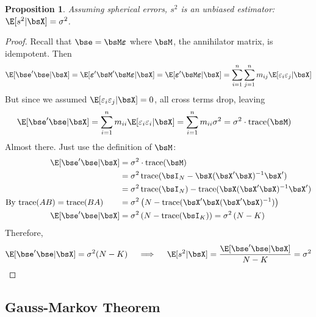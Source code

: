 \documentclass[12pt]{article}
\theoremstyle{plain}
\newtheorem{prop}[thm]{Proposition}
\theoremstyle{definition}
\theoremstyle{remark}
\newcommand{\bsvarepsilon}{\boldsymbol{\varepsilon}}
\newcommand{\trace}{\operatorname{trace}}
\newcommand{\sumin}{\sum^n_{i=1}}
\newcommand{\sumjn}{\sum^n_{j=1}}
\begin{document}
\begin{prop}
Assuming spherical errors, $s^2$ is an unbiased estimator:
$\E[s^2|\bsX]=\sigma^2$.
\end{prop}
\begin{proof}
Recall that $\bse=\bsM\bsvarepsilon$ where $\bsM$, the annihilator
matrix, is idempotent. Then
\begin{align*}
  \E[\bse'\bse|\bsX]
  = \E[\bsvarepsilon'\bsM'\bsM\bsvarepsilon|\bsX]
  = \E[\bsvarepsilon'\bsM\bsvarepsilon|\bsX]
  = \sumin \sumjn m_{ij}\E[\varepsilon_i\varepsilon_j|\bsX]
\end{align*}
But since we assumed $\E[\varepsilon_i\varepsilon_j|\bsX]=0$, all cross
terms drop, leaving
\begin{align*}
  \E[\bse'\bse|\bsX]
  &= \sumin m_{ii}\E[\varepsilon_i\varepsilon_i|\bsX]
  = \sumin m_{ii}\sigma^2
  = \sigma^2 \cdot \trace(\bsM)
\end{align*}
Almost there. Just use the definition of $\bsM$:
\begin{align*}
  \E[\bse'\bse|\bsX]
  &= \sigma^2 \cdot \trace(\bsM) \\
  &= \sigma^2 \trace(\bsI_N - \bsX(\bsX'\bsX)^{-1}\bsX') \\
  &= \sigma^2 \trace(\bsI_N) - \trace(\bsX(\bsX'\bsX)^{-1}\bsX') \\
  \text{By $\trace(AB)=\trace(BA)$}\qquad
  &= \sigma^2 \left(N - \trace(\bsX'\bsX(\bsX'\bsX)^{-1})\right) \\
  \E[\bse'\bse|\bsX]
  &= \sigma^2 \left(N - \trace(\bsI_K)\right)
  = \sigma^2 \left(N - K\right)
\end{align*}
Therefore,
\begin{align*}
  \E[\bse'\bse|\bsX] = \sigma^2(N-K)
  \quad\implies\quad
  \E[s^2|\bsX] = \frac{\E[\bse'\bse|\bsX]}{N-K} = \sigma^2
\end{align*}




\end{proof}



\clearpage
\subsection{Gauss-Markov Theorem}
\end{document}

